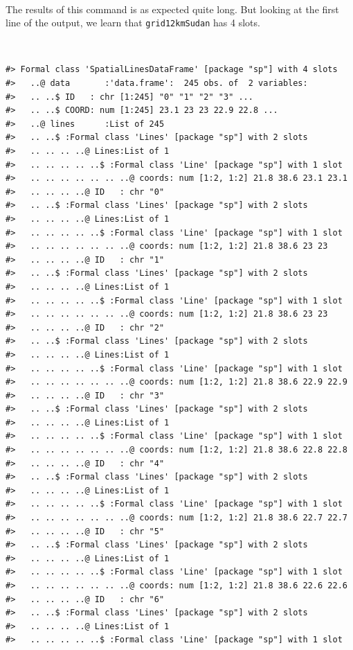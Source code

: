 \documentclass[12pt,a4paper,a4paper]{book}
\theoremstyle{definition}
\theoremstyle{definition}
\theoremstyle{definition}
\theoremstyle{remark}
\begin{document}
~

The results of this command is as expected quite long. But looking at
the first line of the output, we learn that \texttt{grid12kmSudan} has 4
slots.

~

\begin{verbatim}
#> Formal class 'SpatialLinesDataFrame' [package "sp"] with 4 slots
#>   ..@ data       :'data.frame':  245 obs. of  2 variables:
#>   .. ..$ ID   : chr [1:245] "0" "1" "2" "3" ...
#>   .. ..$ COORD: num [1:245] 23.1 23 23 22.9 22.8 ...
#>   ..@ lines      :List of 245
#>   .. ..$ :Formal class 'Lines' [package "sp"] with 2 slots
#>   .. .. .. ..@ Lines:List of 1
#>   .. .. .. .. ..$ :Formal class 'Line' [package "sp"] with 1 slot
#>   .. .. .. .. .. .. ..@ coords: num [1:2, 1:2] 21.8 38.6 23.1 23.1
#>   .. .. .. ..@ ID   : chr "0"
#>   .. ..$ :Formal class 'Lines' [package "sp"] with 2 slots
#>   .. .. .. ..@ Lines:List of 1
#>   .. .. .. .. ..$ :Formal class 'Line' [package "sp"] with 1 slot
#>   .. .. .. .. .. .. ..@ coords: num [1:2, 1:2] 21.8 38.6 23 23
#>   .. .. .. ..@ ID   : chr "1"
#>   .. ..$ :Formal class 'Lines' [package "sp"] with 2 slots
#>   .. .. .. ..@ Lines:List of 1
#>   .. .. .. .. ..$ :Formal class 'Line' [package "sp"] with 1 slot
#>   .. .. .. .. .. .. ..@ coords: num [1:2, 1:2] 21.8 38.6 23 23
#>   .. .. .. ..@ ID   : chr "2"
#>   .. ..$ :Formal class 'Lines' [package "sp"] with 2 slots
#>   .. .. .. ..@ Lines:List of 1
#>   .. .. .. .. ..$ :Formal class 'Line' [package "sp"] with 1 slot
#>   .. .. .. .. .. .. ..@ coords: num [1:2, 1:2] 21.8 38.6 22.9 22.9
#>   .. .. .. ..@ ID   : chr "3"
#>   .. ..$ :Formal class 'Lines' [package "sp"] with 2 slots
#>   .. .. .. ..@ Lines:List of 1
#>   .. .. .. .. ..$ :Formal class 'Line' [package "sp"] with 1 slot
#>   .. .. .. .. .. .. ..@ coords: num [1:2, 1:2] 21.8 38.6 22.8 22.8
#>   .. .. .. ..@ ID   : chr "4"
#>   .. ..$ :Formal class 'Lines' [package "sp"] with 2 slots
#>   .. .. .. ..@ Lines:List of 1
#>   .. .. .. .. ..$ :Formal class 'Line' [package "sp"] with 1 slot
#>   .. .. .. .. .. .. ..@ coords: num [1:2, 1:2] 21.8 38.6 22.7 22.7
#>   .. .. .. ..@ ID   : chr "5"
#>   .. ..$ :Formal class 'Lines' [package "sp"] with 2 slots
#>   .. .. .. ..@ Lines:List of 1
#>   .. .. .. .. ..$ :Formal class 'Line' [package "sp"] with 1 slot
#>   .. .. .. .. .. .. ..@ coords: num [1:2, 1:2] 21.8 38.6 22.6 22.6
#>   .. .. .. ..@ ID   : chr "6"
#>   .. ..$ :Formal class 'Lines' [package "sp"] with 2 slots
#>   .. .. .. ..@ Lines:List of 1
#>   .. .. .. .. ..$ :Formal class 'Line' [package "sp"] with 1 slot

\end{verbatim}
\end{document}
